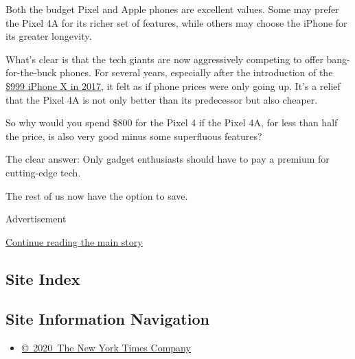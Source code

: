 Both the budget Pixel and Apple phones are excellent values. Some may
prefer the Pixel 4A for its richer set of features, while others may
choose the iPhone for its greater longevity.

What's clear is that the tech giants are now aggressively competing to
offer bang-for-the-buck phones. For several years, especially after the
introduction of the
\href{https://www.nytimes.com/2017/11/01/technology/personaltech/apple-iphone-x-review.html}{\$999
iPhone X in 2017}, it felt as if phone prices were only going up. It's a
relief that the Pixel 4A is not only better than its predecessor but
also cheaper.

So why would you spend \$800 for the Pixel 4 if the Pixel 4A, for less
than half the price, is also very good minus some superfluous features?

The clear answer: Only gadget enthusiasts should have to pay a premium
for cutting-edge tech.

The rest of us now have the option to save.

Advertisement

\protect\hyperlink{after-bottom}{Continue reading the main story}

\hypertarget{site-index}{%
\subsection{Site Index}\label{site-index}}

\hypertarget{site-information-navigation}{%
\subsection{Site Information
Navigation}\label{site-information-navigation}}

\begin{itemize}
\tightlist
\item
  \href{https://help.nytimes.com/hc/en-us/articles/115014792127-Copyright-notice}{©~2020~The
  New York Times Company}
\end{itemize}

